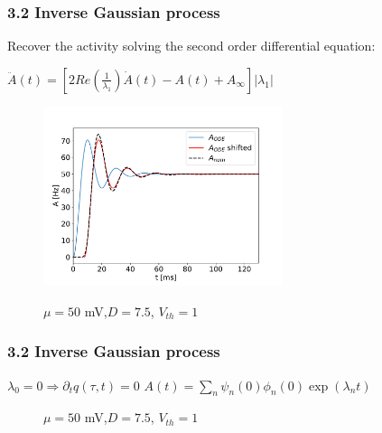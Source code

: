 \documentclass{beamer}
\begin{document}
\begin{frame}
\frametitle{3.2 Inverse Gaussian process}

Recover the activity solving the  second order differential equation:

\hspace{3cm} $\ddot A(t)=[2Re(\frac{1}{\lambda_1})\dot A(t)-A(t)+A_{\infty}] |{\lambda_1}|$

\begin{figure}
	\centering

		\includegraphics[width=70mm]{AODE.pdf}
			
	\vspace{0.5cm}
	\small{$\mu=50$ mV,$D=7.5$, $V_{th}=1$}
\end{figure}



\end{frame}

\begin{frame}
\frametitle{3.2 Inverse Gaussian process}
\hspace{0.7cm}$\lambda_0=0\Rightarrow \partial_t q(\tau,t)=0$ \hspace{0.8cm} $A(t)=\sum_n \psi_n(0)\phi_n(0)\exp(\lambda_nt) $
\begin{figure}
	\centering
	
	\vspace{1cm}
	\small{$\mu=50$ mV,$D=7.5$, $V_{th}=1$}
\end{figure}

\end{frame}
\end{document}

